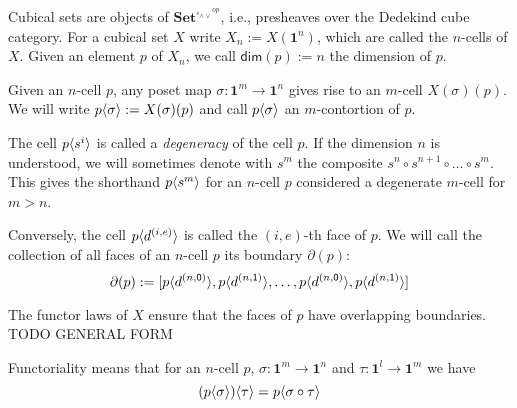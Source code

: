 \documentclass[11pt]{article}
\theoremstyle{definition}
\newcommand{\mdef}{:=}
\newcommand{\mname}[1]{\textit{{#1}}}
\newcommand{\mlist}[1]{[ {#1} ]}
\newcommand{\join}{\wedge}
\newcommand{\meet}{\vee}
\newcommand{\dedekind}{\square_{\join \meet}}
\newcommand{\pint}[1]{\mathbf{1}^{#1}}
\newcommand{\izero}{\mathsf{0}}
\newcommand{\ione}{\mathsf{1}}
\newcommand{\psh}[1]{\mathbf{Set}^{{#1}^{op}}}
\renewcommand{\dim}[1]{\mathsf{dim}({#1})}
\newcommand{\smap}[1]{s^{{#1}}}
\newcommand{\dmap}[2]{d^{({#1} , {#2})}}
\newcommand{\cont}[2]{ \ifthenelse{\equal{#2}{}}{#1}{{#1}\langle{#2}\rangle} }
\newcommand{\boundary}[1]{\partial({#1})}
\begin{document}
Cubical sets are objects of $\psh{\dedekind}$, i.e., presheaves over the
Dedekind cube category. For a cubical set $X$ write $X_n \mdef X(\pint{n})$,
which are called the $n$-cells of $X$. Given an element $p$ of $X_n$, we call
$\dim{p} \mdef n$ the dimension of $p$.


Given an $n$-cell $p$, any poset map $\sigma : \pint{m} \to \pint{n}$ gives rise to an $m$-cell
$X(\sigma)(p)$. We will write $\cont{p}{\sigma} \mdef X(\sigma)(p)$ and call
$\cont{p}{\sigma}$ an $m$-contortion of $p$.

The cell $\cont{p}{\smap{i}}$ is called a \mname{degeneracy} of the cell $p$. If
the dimension $n$ is understood, we will sometimes denote with $\smap{m}$ the
composite $\smap{n} \circ \smap{n+1} \circ \ldots \circ \smap{m}$. This gives
the shorthand $\cont{p}{\smap{m}}$ for an $n$-cell $p$ considered a degenerate
$m$-cell for $m > n$.

Conversely, the cell $\cont{p}{\dmap{i}{e}}$ is called the $(i,e)$-th face of $p$. We
will call the collection of all faces of an $n$-cell $p$ its boundary $\boundary{p}$:
$$\boundary{p} \mdef \mlist{ \cont{p}{\dmap{n}{\izero}},
  \cont{p}{\dmap{n}{\ione}} , \ldots , \cont{p}{\dmap{n}{\izero}}, \cont{p}{\dmap{n}{\ione}} }$$

The functor laws of $X$ ensure that the faces of $p$ have overlapping
boundaries. TODO GENERAL FORM



Functoriality means that for an $n$-cell $p$, $\sigma : \pint{m} \to \pint{n}$ and $\tau : \pint{l} \to \pint{m}$ we have
$$\cont{(\cont{p}{\sigma})}{\tau} = \cont{p}{\sigma \circ \tau}$$
\end{document}
